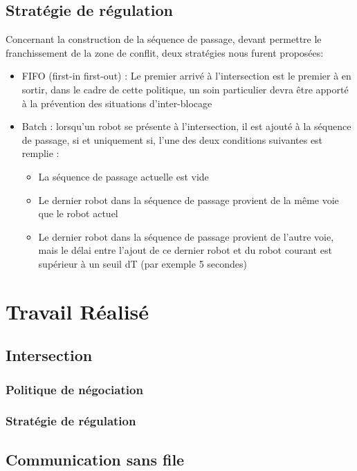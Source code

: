 \documentclass[french,a4paper,12pt]{report}
\begin{document}
\chapter{Stratégie de régulation}
Concernant la construction de la séquence de passage, devant permettre le franchissement de la zone de conflit, deux stratégies nous furent proposées:

\begin{itemize}
\item FIFO (first-in first-out) : 
	Le premier arrivé à l’intersection est le premier à en sortir, dans le cadre de cette
	politique, un soin particulier devra être apporté à la prévention des situations d’inter-blocage
	
\item Batch : lorsqu’un robot se présente à l’intersection, il est ajouté à la séquence de passage, si et
	uniquement si, l’une des deux conditions suivantes est remplie :
	\begin{itemize}
	\item La séquence de passage actuelle est vide
	\item Le dernier robot dans la séquence de passage provient de la même voie que le robot actuel
	\item Le dernier robot dans la séquence de passage provient de l’autre voie, mais le délai entre l’ajout
		de ce dernier robot et du robot courant est supérieur à un seuil dT (par exemple 5 secondes)
	\end{itemize}
\end{itemize}

\part{Travail Réalisé}


\chapter{Intersection}

\section{Politique de négociation}

\section{Stratégie de régulation}

\chapter{Communication sans file}
\end{document}
